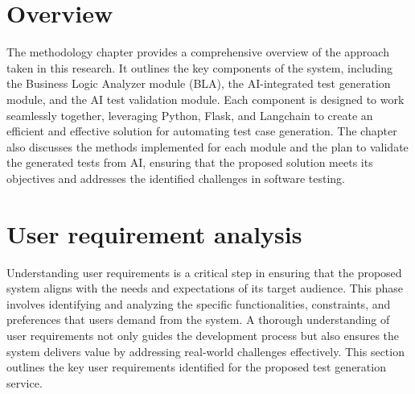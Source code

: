 \section{Overview}

\hspace{0.5cm}The methodology chapter provides a comprehensive overview of the approach taken in this research. It outlines the key components of the system, including the Business Logic Analyzer module (BLA), the AI-integrated test generation module, and the AI test validation module. Each component is designed to work seamlessly together, leveraging Python, Flask, and Langchain to create an efficient and effective solution for automating test case generation. The chapter also discusses the methods implemented for each module and the plan to validate the generated tests from AI, ensuring that the proposed solution meets its objectives and addresses the identified challenges in software testing.
\section{User requirement analysis}

\hspace{0.5cm}Understanding user requirements is a critical step in ensuring that the proposed system aligns with the needs and expectations of its target audience. This phase involves identifying and analyzing the specific functionalities, constraints, and preferences that users demand from the system. A thorough understanding of user requirements not only guides the development process but also ensures the system delivers value by addressing real-world challenges effectively. This section outlines the key user requirements identified for the proposed test generation service.

